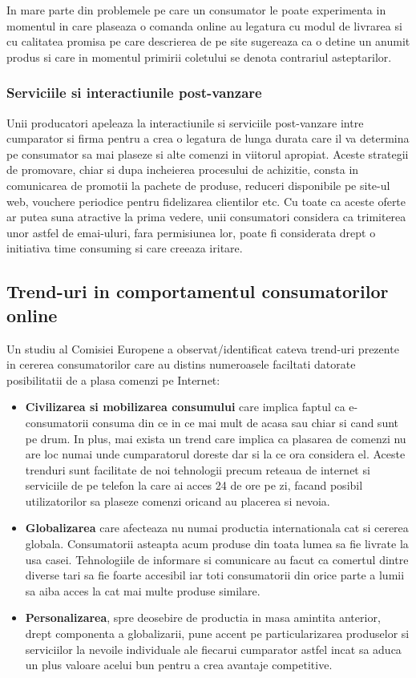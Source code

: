 \documentclass[a4paper, 12pt]{article}
\begin{document}
		\quad In mare parte din problemele pe care un consumator le poate experimenta in momentul in care plaseaza o comanda online au legatura cu  modul de livrarea si cu calitatea promisa pe care descrierea de pe site sugereaza ca o detine un anumit produs si care in momentul primirii coletului se denota contrariul asteptarilor.
		
		\subsubsection{Serviciile si interactiunile post-vanzare}
		
		\quad\quad Unii producatori apeleaza la interactiunile si serviciile post-vanzare intre cumparator si firma pentru a crea o legatura de lunga durata care il va determina pe consumator sa mai plaseze si alte comenzi in viitorul apropiat. Aceste strategii de promovare, chiar si dupa incheierea procesului de achizitie, consta in comunicarea de promotii la pachete de produse, reduceri disponibile pe site-ul web, vouchere periodice pentru fidelizarea clientilor etc. Cu toate ca aceste oferte ar putea suna atractive la prima vedere, unii consumatori considera ca trimiterea unor astfel de emai-uluri, fara permisiunea lor, poate fi considerata drept o initiativa time consuming si care creeaza iritare.
		
		\quad\subsection{Trend-uri in comportamentul consumatorilor online} 
		Un studiu al Comisiei Europene a observat/identificat cateva trend-uri prezente in cererea consumatorilor care au distins numeroasele faciltati datorate posibilitatii de a plasa comenzi pe Internet:
		\begin{itemize}
			\item \textbf{Civilizarea si mobilizarea consumului} care implica faptul ca e-consumatorii consuma din ce in ce mai mult de acasa sau chiar si cand sunt pe drum. In plus, mai exista un trend care implica ca plasarea de comenzi nu are loc numai unde cumparatorul doreste dar si la ce ora considera el. Aceste trenduri sunt facilitate de noi tehnologii precum reteaua de internet si serviciile de pe telefon la care ai acces 24 de ore pe zi, facand posibil utilizatorilor sa plaseze comenzi oricand au placerea si nevoia.
			\item \textbf{Globalizarea} care afecteaza nu numai productia internationala cat si cererea globala. Consumatorii asteapta acum produse din toata lumea sa fie livrate la usa casei. Tehnologiile de informare si comunicare au facut ca comertul dintre diverse tari sa fie foarte accesibil iar toti consumatorii din orice parte a lumii sa aiba acces la cat mai multe produse similare.
			\item \textbf{Personalizarea}, spre deosebire de productia in masa amintita anterior, drept componenta a globalizarii, pune accent pe particularizarea produselor si serviciilor la nevoile individuale ale fiecarui cumparator astfel incat sa aduca un plus valoare acelui bun pentru a crea avantaje competitive.
		\end{itemize}
		
\end{document}
